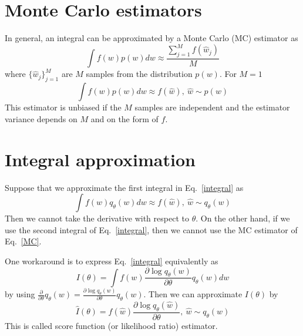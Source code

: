 \section{Monte Carlo estimators}\label{}
In general, an integral can be approximated by a Monte Carlo (MC) estimator as
\begin{equation}
	\int f(w)p(w)dw \approx \frac{\sum_{j=1}^{M}f(\hat{w}_j)}{M}
\end{equation}
where $\{\hat{w}_j\}_{j=1}^{M}$ are $M$ samples from the distribution $p(w)$. 
For $M = 1$ 
\begin{equation}\label{MC}
\int f(w)p(w)dw \approx f(\hat{w}), \ \hat{w} \sim p(w)
\end{equation}
This estimator is unbiased if the $M$ samples are independent and the estimator variance depends on $M$ and on the form of $f$. 

\section{Integral approximation}
Suppose that we approximate the first integral in Eq.~\eqref{integral} as
\begin{equation}\label{}
\int f(w)q_{\theta}(w)dw \approx f(\hat{w}), \ \hat{w} \sim q_{\theta}(w)
\end{equation}
Then we cannot take the derivative with respect to $\theta$. 
On the other hand, if we use the second integral of Eq.~\eqref{integral}, then we cannot use the MC estimator of Eq.~\eqref{MC}. 

One workaround is to express Eq.~\eqref{integral} equivalently as
\begin{equation}\label{}
I(\theta) = \int f(w)\frac{\partial \log q_{\theta}(w) }{\partial \theta} q_{\theta}(w)dw
\end{equation}
by using $\frac{\partial  }{\partial \theta} q_{\theta}(w)= \frac{\partial \log q_{\theta}(w) }{\partial \theta} q_{\theta}(w)$.
Then we can approximate $I(\theta)$ by
\begin{equation}\label{}
\hat{I}(\theta) = f(\hat{w})\frac{\partial \log q_{\theta}(\hat{w}) }{\partial \theta}  , \ \hat{w} \sim q_{\theta}(w)
\end{equation}
This is called score function (or likelihood ratio) estimator. 

